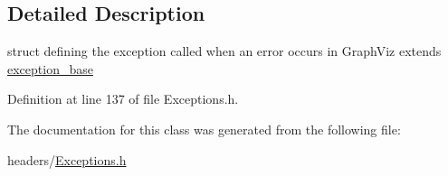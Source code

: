 \subsection{Detailed Description}
struct defining the exception called when an error occurs in Graph\+Viz extends \hyperlink{structexception__base}{exception\+\_\+base} 

Definition at line 137 of file Exceptions.\+h.



The documentation for this class was generated from the following file\+:\begin{DoxyCompactItemize}
\item 
headers/\hyperlink{Exceptions_8h}{Exceptions.\+h}\end{DoxyCompactItemize}
